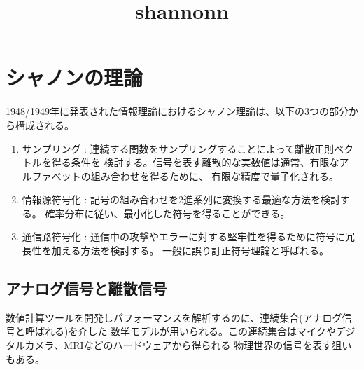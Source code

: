 \documentclass[dvipdfmx]{jsarticle}
\begin{document}
\title{shannonn}

\section{シャノンの理論}
1948/1949年に発表された情報理論におけるシャノン理論は、以下の3つの部分から構成される。

\begin{enumerate}

  \item サンプリング : 連続する関数をサンプリングすることによって離散正則ベクトルを得る条件を
        検討する。信号を表す離散的な実数値は通常、有限なアルファベットの組み合わせを得るために、
        有限な精度で量子化される。

  \item 情報源符号化 :  記号の組み合わせを2進系列に変換する最適な方法を検討する。
        確率分布に従い、最小化した符号を得ることができる。

  \item 通信路符号化 :  通信中の攻撃やエラーに対する堅牢性を得るために符号に冗長性を加える方法を検討する。
        一般に誤り訂正符号理論と呼ばれる。

\end{enumerate}

\subsection{アナログ信号と離散信号}
数値計算ツールを開発しパフォーマンスを解析するのに、連続集合(アナログ信号と呼ばれる)を介した
数学モデルが用いられる。この連続集合はマイクやデジタルカメラ、MRIなどのハードウェアから得られる
物理世界の信号を表す狙いもある。
\end{document}
